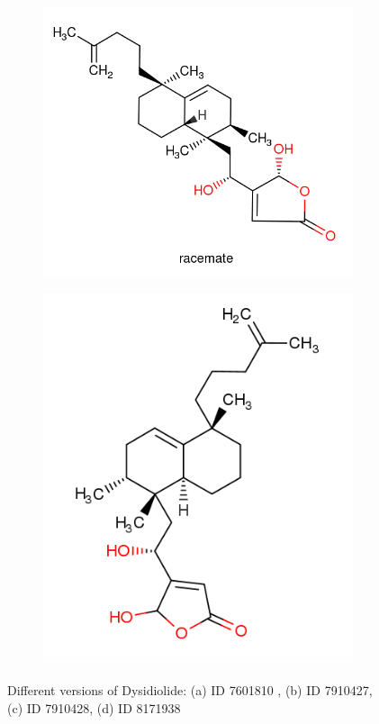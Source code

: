 \documentclass[a4paper,10pt,titlepage]{paper}
\begin{document}
\begin{figure}[H]
\begin{subfigure}{.5\textwidth}
  \caption{}
\end{subfigure}
\begin{subfigure}{.5\textwidth}
  \centering
  \vspace{0.4cm}
  \includegraphics[width=.8\linewidth]{Billeder/Dysidiolide-7910428-Close.png}
  \vspace{1.3cm}
  \caption{}
\end{subfigure}%
\begin{subfigure}{.5\textwidth}
  \centering
  \includegraphics[width=.8\linewidth]{Billeder/Dysidiolide-8171938-Close.png}
  \caption{}
\end{subfigure}
\caption{Different versions of Dysidiolide: (a) ID 7601810 , (b) ID 7910427, (c) ID 7910428,  (d) ID 8171938}
\label{fig::SameIDClose}
\end{figure}
\end{document}
